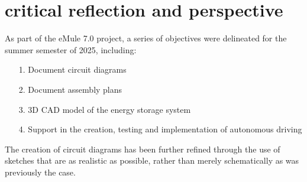 \chapter{critical reflection and perspective}
\label{cha:zusammenfassung}


As part of the eMule 7.0 project, a series of objectives were delineated for the summer semester of 2025, including:
\begin{itemize}
	\item[1.] Document circuit diagrams
\item[2.] Document assembly plans
\item[3.] 3D CAD model of the energy storage system
\item[4.] Support in the creation, testing and implementation of autonomous driving

\end{itemize}

The creation of circuit diagrams has been further refined through the use of sketches that are as realistic as possible, rather than merely schematically as was previously the case.

